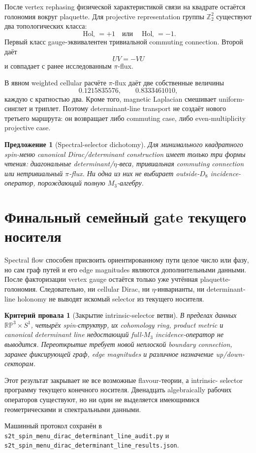 \documentclass[12pt,a4paper]{article}
\newtheorem{proposition}{Предложение}
\newtheorem{nogocriterion}{Критерий провала}
\begin{document}
После vertex rephasing физической характеристикой связи на квадрате остаётся
голономия вокруг plaquette. Для projective representation группы
$\mathbb Z_2^2$ существуют два топологических класса:
\begin{equation}
 \operatorname{Hol}_{\square}=+1
 \quad\text{или}\quad
 \operatorname{Hol}_{\square}=-1.
\end{equation}
Первый класс gauge-эквивалентен тривиальной commuting connection. Второй даёт
\begin{equation}
 UV=-VU
\end{equation}
и совпадает с ранее исследованным $\pi$-flux.

В явном weighted cellular расчёте $\pi$-flux даёт две собственные величины
\begin{equation}
 0.1215835576,\qquad 0.8333461010,
\end{equation}
каждую с кратностью два. Кроме того, magnetic Laplacian смешивает uniform-
синглет и триплет. Поэтому determinant-line transport не создаёт нового
третьего маршрута: он возвращает либо commuting case, либо even-multiplicity
projective case.

\begin{proposition}[Spectral-selector dichotomy]
Для минимального квадратного spin-меню canonical Dirac/determinant construction
имеет только три формы чтения: диагональные determinant/$\eta$-веса,
тривиальная commuting connection или нетривиальный $\pi$-flux. Ни одна из них
не выбирает outside-$D_8$ incidence-оператор, порождающий полную $M_3$-алгебру.
\end{proposition}

\section{Финальный семейный gate текущего носителя}

Spectral flow способен присвоить ориентированному пути целое число или фазу,
но сам граф путей и его edge magnitudes являются дополнительными данными.
После факторизации vertex gauge остаётся только уже учтённая plaquette-
голономия. Следовательно, ни cellular Dirac, ни $\eta$-инварианты, ни
determinant-line holonomy не выводят искомый selector из текущего носителя.

\begin{nogocriterion}[Закрытие intrinsic-selector ветви]
В пределах данных $\mathbb{RP}^3\times S^1$, четырёх spin-структур, их
cohomology ring, product metric и canonical determinant line недостающий
full-$M_3$ incidence-оператор не выводится. Переоткрытие требует новой
неплоской boundary connection, заранее фиксирующей граф, edge magnitudes и
различное назначение up/down-секторам.
\end{nogocriterion}

Этот результат закрывает не все возможные flavour-теории, а intrinsic-
selector программу текущего конечного носителя. Двенадцать algebraically
рабочих операторов существуют, но ни один не выделяется имеющимися
геометрическими и спектральными данными.

Машинный протокол сохранён в
\texttt{s2t\_spin\_menu\_dirac\_determinant\_line\_audit.py} и
\texttt{s2t\_spin\_menu\_dirac\_determinant\_line\_results.json}.
\end{document}
